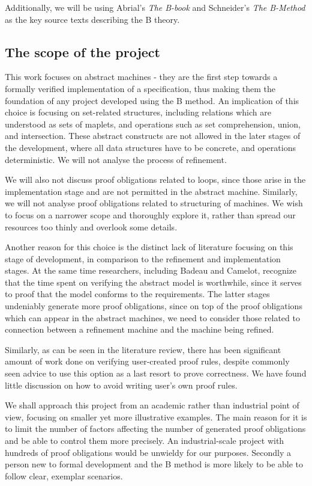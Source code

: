 \documentclass[12pt,journal,duplex]{IEEEtran}
\begin{document}
	Additionally, we will be using Abrial's \emph{The B-book} and Schneider's \emph{The B-Method} as the key source texts describing the B theory.

	\subsection{The scope of the project}
	This work focuses on abstract machines - they are the first step towards a formally verified implementation of a specification, thus making them the foundation of any project developed using the B method. An implication of this choice is focusing on set-related structures, including relations which are understood as sets of maplets, and operations such as set comprehension, union, and intersection. These abstract constructs are not allowed in the later stages of the development, where all data structures have to be concrete, and operations deterministic. We will not analyse the process of refinement.
	
	We will also not discuss proof obligations related to loops, since those arise in the implementation stage and are not permitted in the abstract machine. Similarly, we will not analyse proof obligations related to structuring of machines. We wish to focus on a narrower scope and thoroughly explore it, rather than spread our resources too thinly and overlook some details.

	Another reason for this choice is the distinct lack of literature focusing on this stage of development, in comparison to the refinement and implementation stages. At the same time researchers, including Badeau and Camelot, recognize that the time spent on verifying the abstract model is worthwhile, since it serves to proof that the model conforms to the requirements\cite{airport shuttle}. The latter stages undeniably generate more proof obligations, since on top of the proof obligations which can appear in the abstract machines, we need to consider those related to connection between a refinement machine and the machine being refined.

	Similarly, as can be seen in the literature review, there has been significant amount of work done on verifying user-created proof rules, despite commonly seen advice to use this option as a last resort to prove correctness. We have found little discussion on how to avoid writing user's own proof rules.

	We shall approach this project from an academic rather than industrial point of view, focusing on smaller yet more illustrative examples. The main reason for it is to limit the number of factors affecting the number of generated proof obligations and be able to control them more precisely. An industrial-scale project with hundreds of proof obligations would be unwieldy for our purposes. Secondly a person new to formal development and the B method is more likely to be able to follow clear, exemplar scenarios.
\end{document}
